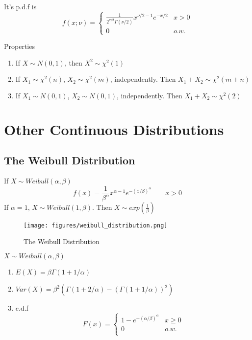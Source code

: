 It's p.d.f is
\[f(x;\nu)=\begin{cases}
\frac{1}{2^{\nu/2}\Gamma(\nu/2)} x^{\nu/2-1}e^{-x/2} & x>0 \\
0 & o.w.
\end{cases}\]


\begin{prop}
Properties
\begin{enumerate}
\item If $X \sim N(0,1)$, then $X^2 \sim \chi^2 (1)$
\item If $X_1 \sim \chi^2 (n)$, $X_2 \sim \chi^2 (m)$, independently. Then $X_1+X_2 \sim \chi^2 (m+n)$ 
\item If $X_1 \sim N(0,1)$, $X_2 \sim N(0,1)$, independently. Then $X_1+X_2 \sim \chi^2 (2)$ 
\end{enumerate}
\end{prop}

\section{Other Continuous Distributions}
\subsection{The Weibull Distribution}
If $X \sim Weibull(\alpha,\beta)$
\[f(x)=\frac{1}{\beta^{\alpha}}x^{\alpha-1}e^{-(x/\beta)^{\alpha}} \qquad x >0\]
If $\alpha=1$, $X \sim Weibull(1,\beta)$. Then $X \sim exp(\frac{1}{\beta}) $

\begin{figure}[H]
\centering
\texttt{[image: figures/weibull\_distribution.png]}
\caption{The Weibull Distribution}
\end{figure}

\begin{prop}
 $X \sim Weibull(\alpha,\beta)$
\begin{enumerate}
\item $E(X)=\beta \Gamma(1+1/\alpha)$
\item $Var(X)=\beta^2\left(\Gamma(1+2/\alpha)-(\Gamma(1+1/\alpha))^2\right)$
\item c.d.f
\[F(x)=\begin{cases}
1-e^{-(\alpha/\beta)^{\alpha}} & x \geq 0 \\
0	&o.w. \\
\end{cases}\]
\end{enumerate}
\end{prop}

